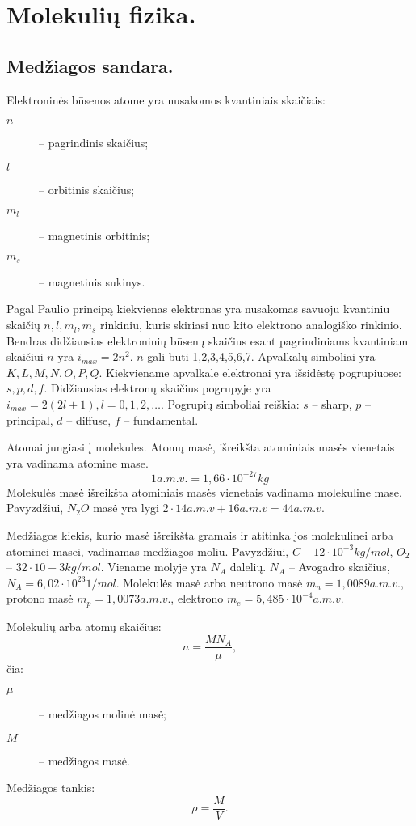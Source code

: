 \chapter{Molekulių fizika.}

\section{Medžiagos sandara.}

Elektroninės būsenos atome yra nusakomos kvantiniais skaičiais:
\begin{description}
  \item[$n$] – pagrindinis skaičius;
  \item[$l$] – orbitinis skaičius;
  \item[$m_{l}$] – magnetinis orbitinis;
  \item[$m_{s}$] – magnetinis sukinys.
\end{description}
Pagal Paulio principą kiekvienas elektronas yra nusakomas savuoju
kvantiniu skaičių $n, l, m_{l}, m_{s}$ rinkiniu, kuris skiriasi
nuo kito elektrono analogiško rinkinio. Bendras didžiausias
elektroninių būsenų skaičius esant pagrindiniams kvantiniam
skaičiui $n$ yra $i_{max} = 2n^{2}$. $n$ gali būti 1,2,3,4,5,6,7.
Apvalkalų simboliai yra $K, L, M, N, O, P, Q$. Kiekviename
apvalkale elektronai yra išsidėstę pogrupiuose: $s, p, d, f$.
Didžiausias elektronų skaičius pogrupyje yra
$i_{max} = 2(2l + 1), l = 0, 1, 2,\ldots$. Pogrupių simboliai
reiškia: $s$ – sharp, $p$ – principal, $d$ – diffuse, $f$ – fundamental.

Atomai jungiasi į molekules. Atomų masė, išreikšta atominiais masės
vienetais yra vadinama atomine mase.
\begin{equation*}
  1 a.m.v. = 1,66 \cdot 10^{-27} kg
\end{equation*}
Molekulės masė išreikšta atominiais masės vienetais vadinama
molekuline mase. Pavyzdžiui, $N_{2}O$ masė yra lygi
$2\cdot 14 a.m.v + 16 a.m.v = 44 a.m.v.$

Medžiagos kiekis, kurio masė išreikšta gramais ir atitinka jos
molekulinei arba atominei masei, vadinamas medžiagos moliu.
Pavyzdžiui, $C$ – $12\cdot10^{-3} kg/mol$, $O_{2}$ –
$32\cdot10-3 kg/mol$. Viename molyje yra $N_{A}$ dalelių.
$N_{A}$ – Avogadro skaičius, $N_{A} = 6,02 \cdot 10^{23} 1/mol$.
Molekulės masė arba neutrono masė $m_{n} = 1,0089 a.m.v.$, protono
masė $m_{p} = 1,0073 a.m.v.$, elektrono
$m_{e} = 5,485 \cdot 10^{-4} a.m.v.$

Molekulių arba atomų skaičius:
\begin{equation*}
  n = \frac{MN_{A}}{\mu},
\end{equation*}
čia:
\begin{description}
  \item[$\mu$] – medžiagos molinė masė;
  \item[$M$] – medžiagos masė.
\end{description}
Medžiagos tankis:
\begin{equation*}
  \rho = \frac{M}{V}.
\end{equation*}


